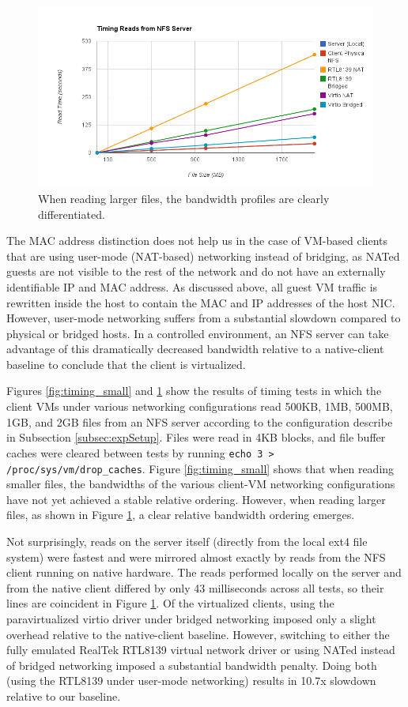 \documentclass[letterpaper,twocolumn,11pt]{article}
\begin{document}
\begin{figure}[htb]
		\includegraphics[scale=0.3]{timing_large.png}
	\caption{When reading larger files, the bandwidth profiles are clearly differentiated.}
	\label{fig:timing_large}
\end{figure}

The MAC address distinction does not help us in the case of VM-based clients that are using user-mode (NAT-based) networking instead of bridging, as NATed guests are not visible to the rest of the network and do not have an externally identifiable IP and MAC address. As discussed above, all guest VM traffic is rewritten inside the host to contain the MAC and IP addresses of the host NIC. However, user-mode networking suffers from a substantial slowdown compared to physical or bridged hosts. In a controlled environment, an NFS server can take advantage of this dramatically decreased bandwidth relative to a native-client baseline to conclude that the client is virtualized. 

Figures \ref{fig:timing_small} and \ref{fig:timing_large} show the results of timing tests in which the client VMs under various networking configurations read 500KB, 1MB, 500MB, 1GB, and 2GB files from an NFS server according to the configuration describe in Subsection \ref{subsec:expSetup}. Files were read in 4KB blocks, and file buffer caches were cleared between tests by running \texttt{echo 3 > /proc/sys/vm/drop\_caches}. Figure \ref{fig:timing_small} shows that when reading smaller files, the bandwidths of the various client-VM networking configurations have not yet achieved a stable relative ordering. However, when reading larger files, as shown in Figure \ref{fig:timing_large}, a clear relative bandwidth ordering emerges.

Not surprisingly, reads on the server itself (directly from the local ext4 file system) were fastest and were mirrored almost exactly by reads from the NFS client running on native hardware. The reads performed locally on the server and from the native client differed by only 43 milliseconds across all tests, so their lines are coincident in Figure \ref{fig:timing_large}. Of the virtualized clients, using the paravirtualized virtio driver under bridged networking imposed only a slight overhead relative to the native-client baseline. However, switching to either the fully emulated RealTek RTL8139 virtual network driver or using NATed instead of bridged networking imposed a substantial bandwidth penalty. Doing both (using the RTL8139 under user-mode networking) results in 10.7x slowdown relative to our baseline. 
\end{document}
